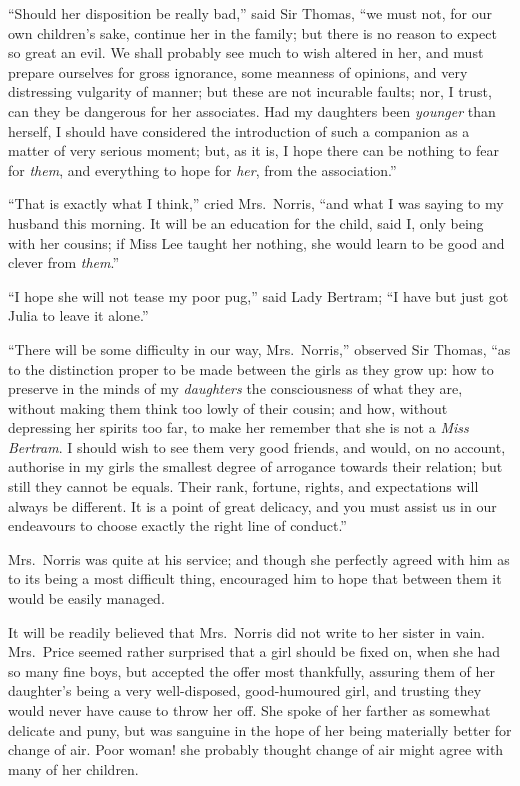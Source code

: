 ``Should her disposition be really bad,'' said Sir Thomas,
``we must not, for our own children's sake, continue her
in the family; but there is no reason to expect so great
an evil.  We shall probably see much to wish altered
in her, and must prepare ourselves for gross ignorance,
some meanness of opinions, and very distressing vulgarity
of manner; but these are not incurable faults; nor, I trust,
can they be dangerous for her associates.  Had my daughters
been \emph{younger} than herself, I should have considered
the introduction of such a companion as a matter of very
serious moment; but, as it is, I hope there can be nothing
to fear for \emph{them}, and everything to hope for \emph{her},
from the association.''

``That is exactly what I think,'' cried Mrs.\ Norris,
``and what I was saying to my husband this morning.
It will be an education for the child, said I, only being
with her cousins; if Miss Lee taught her nothing, she would
learn to be good and clever from \emph{them}.''

``I hope she will not tease my poor pug,'' said Lady Bertram;
``I have but just got Julia to leave it alone.''

``There will be some difficulty in our way, Mrs.\ Norris,''
observed Sir Thomas, ``as to the distinction proper to be made
between the girls as they grow up:  how to preserve in the
minds of my \emph{daughters} the consciousness of what they are,
without making them think too lowly of their cousin;
and how, without depressing her spirits too far,
to make her remember that she is not a \emph{Miss Bertram}.
I should wish to see them very good friends, and would,
on no account, authorise in my girls the smallest degree
of arrogance towards their relation; but still they cannot
be equals.  Their rank, fortune, rights, and expectations
will always be different.  It is a point of great delicacy,
and you must assist us in our endeavours to choose exactly
the right line of conduct.''

Mrs.\ Norris was quite at his service; and though she
perfectly agreed with him as to its being a most
difficult thing, encouraged him to hope that between
them it would be easily managed.

It will be readily believed that Mrs.\ Norris did not write
to her sister in vain.  Mrs.\ Price seemed rather surprised
that a girl should be fixed on, when she had so many fine boys,
but accepted the offer most thankfully, assuring them of her
daughter's being a very well-disposed, good-humoured girl,
and trusting they would never have cause to throw her off.
She spoke of her farther as somewhat delicate and puny,
but was sanguine in the hope of her being materially better
for change of air.  Poor woman! she probably thought
change of air might agree with many of her children.



